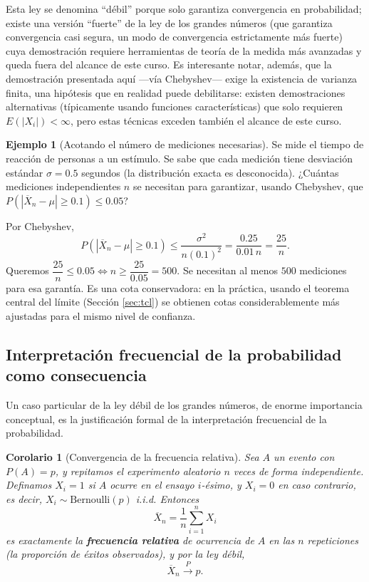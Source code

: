 \documentclass[11pt,a4paper]{article}
\theoremstyle{plain}
\newtheorem{corolario}[teorema]{Corolario}
\theoremstyle{definition}
\newtheorem{ejemplo}[teorema]{Ejemplo}
\theoremstyle{remark}
\begin{document}
Esta ley se denomina ``débil'' porque solo garantiza convergencia en probabilidad; existe una versión ``fuerte'' de la ley de los grandes números (que garantiza convergencia casi segura, un modo de convergencia estrictamente más fuerte) cuya demostración requiere herramientas de teoría de la medida más avanzadas y queda fuera del alcance de este curso. Es interesante notar, además, que la demostración presentada aquí —vía Chebyshev— exige la existencia de varianza finita, una hipótesis que en realidad puede debilitarse: existen demostraciones alternativas (típicamente usando funciones características) que solo requieren $E(|X_i|)<\infty$, pero estas técnicas exceden también el alcance de este curso.

\begin{ejemplo}[Acotando el número de mediciones necesarias]
Se mide el tiempo de reacción de personas a un estímulo. Se sabe que cada medición tiene desviación estándar $\sigma=0.5$ segundos (la distribución exacta es desconocida). ¿Cuántas mediciones independientes $n$ se necesitan para garantizar, usando Chebyshev, que $P(|\overline{X}_n-\mu|\geq 0.1)\leq 0.05$?

Por Chebyshev,
\[
P(|\overline{X}_n-\mu|\geq 0.1) \leq \frac{\sigma^2}{n(0.1)^2} = \frac{0.25}{0.01\,n} = \frac{25}{n}.
\]
Queremos $\dfrac{25}{n}\leq 0.05 \iff n\geq \dfrac{25}{0.05}=500$. Se necesitan al menos $500$ mediciones para esa garantía. Es una cota conservadora: en la práctica, usando el teorema central del límite (Sección \ref{sec:tcl}) se obtienen cotas considerablemente más ajustadas para el mismo nivel de confianza.
\end{ejemplo}

\subsection{Interpretación frecuencial de la probabilidad como consecuencia}

Un caso particular de la ley débil de los grandes números, de enorme importancia conceptual, es la justificación formal de la interpretación frecuencial de la probabilidad.

\begin{corolario}[Convergencia de la frecuencia relativa]
Sea $A$ un evento con $P(A)=p$, y repitamos el experimento aleatorio $n$ veces de forma independiente. Definamos $X_i=1$ si $A$ ocurre en el ensayo $i$-ésimo, y $X_i=0$ en caso contrario, es decir, $X_i\sim\text{Bernoulli}(p)$ i.i.d. Entonces
\[
\overline{X}_n = \frac1n\sum_{i=1}^n X_i
\]
es exactamente la \textbf{frecuencia relativa} de ocurrencia de $A$ en las $n$ repeticiones (la proporción de éxitos observados), y por la ley débil,
\[
\overline{X}_n \xrightarrow{P} p.
\]
\end{corolario}
\end{document}
